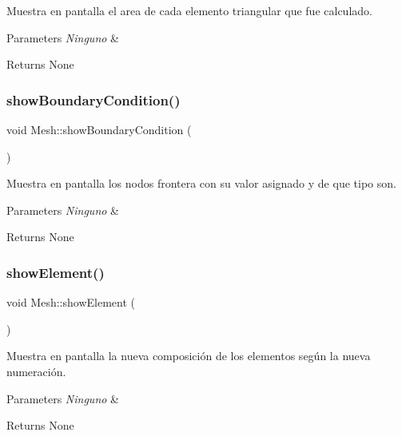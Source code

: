 Muestra en pantalla el area de cada elemento triangular que fue calculado. 


\begin{DoxyParams}{Parameters}
{\em Ninguno} & \\
\hline
\end{DoxyParams}
\begin{DoxyReturn}{Returns}
None 
\end{DoxyReturn}
\hypertarget{class_mesh_a45a42ffc6565851e50e47b6b618c22f5}{}\label{class_mesh_a45a42ffc6565851e50e47b6b618c22f5} 
\subsubsection{\texorpdfstring{show\+Boundary\+Condition()}{showBoundaryCondition()}}
{\footnotesize\ttfamily void Mesh\+::show\+Boundary\+Condition (\begin{DoxyParamCaption}{ }\end{DoxyParamCaption})}



Muestra en pantalla los nodos frontera con su valor asignado y de que tipo son. 


\begin{DoxyParams}{Parameters}
{\em Ninguno} & \\
\hline
\end{DoxyParams}
\begin{DoxyReturn}{Returns}
None 
\end{DoxyReturn}
\hypertarget{class_mesh_a0d528aac55b1e4c2a6f5049f9d2cf90d}{}\label{class_mesh_a0d528aac55b1e4c2a6f5049f9d2cf90d} 
\subsubsection{\texorpdfstring{show\+Element()}{showElement()}}
{\footnotesize\ttfamily void Mesh\+::show\+Element (\begin{DoxyParamCaption}{ }\end{DoxyParamCaption})}



Muestra en pantalla la nueva composición de los elementos según la nueva numeración. 


\begin{DoxyParams}{Parameters}
{\em Ninguno} & \\
\hline
\end{DoxyParams}
\begin{DoxyReturn}{Returns}
None 
\end{DoxyReturn}
\hypertarget{class_mesh_a895299dd6c9c2e2ffb5ef59becc81fd3}{}\label{class_mesh_a895299dd6c9c2e2ffb5ef59becc81fd3} 
